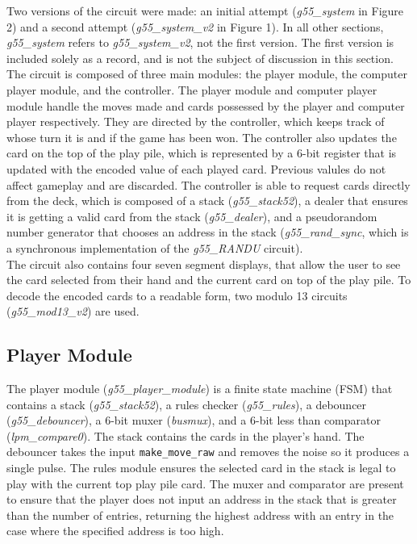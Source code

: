\documentclass[12pt]{article}
\begin{document}
Two versions of the circuit were made: an initial attempt (\textit{g55\_system} in Figure 2) and a second attempt (\textit{g55\_system\_v2} in Figure 1). In all other sections, \textit{g55\_system} refers to \textit{g55\_system\_v2}, not the first version. The first version is included solely as a record, and is not the subject of discussion in this section. The circuit is composed of three main modules: the player module, the computer player module, and the controller. The player module and computer player module handle the moves made and cards possessed by the player and computer player respectively. They are directed by the controller, which keeps track of whose turn it is and if the game has been won. The controller also updates the card on the top of the play pile, which is represented by a 6-bit register that is updated with the encoded value of each played card. Previous valules do not affect gameplay and are discarded. The controller is able to request cards directly from the deck, which is composed of a stack (\textit{g55\_stack52}), a dealer that ensures it is getting a valid card from the stack (\textit{g55\_dealer}), and a pseudorandom number generator that chooses an address in the stack (\textit{g55\_rand\_sync}, which is a synchronous implementation of the \textit{g55\_RANDU} circuit).\\

The circuit also contains four seven segment displays, that allow the user to see the card selected from their hand and the current card on top of the play pile. To decode the encoded cards to a readable form, two modulo 13 circuits (\textit{g55\_mod13\_v2}) are used.

\subsection{Player Module}

The player module (\textit{g55\_player\_module}) is a finite state machine (FSM) that contains a stack (\textit{g55\_stack52}), a rules checker (\textit{g55\_rules}), a debouncer (\textit{g55\_debouncer}), a 6-bit muxer (\textit{busmux}), and a 6-bit less than comparator (\textit{lpm\_compare0}). The stack contains the cards in the player's hand. The debouncer takes the input \texttt{make\_move\_raw} and removes the noise so it produces a single pulse. The rules module ensures the selected card in the stack is legal to play with the current top play pile card. The muxer and comparator are present to ensure that the player does not input an address in the stack that is greater than the number of entries, returning the highest address with an entry in the case where the specified address is too high. \\
\end{document}
